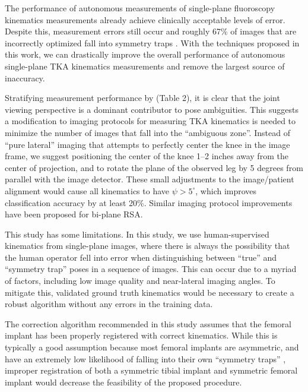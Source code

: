 {The performance of autonomous measurements of single-plane fluoroscopy
kinematics measurements already achieve clinically acceptable levels of error.
Despite this, measurement errors still occur and roughly 67\% of images that are
incorrectly optimized fall into symmetry traps
\cite{jensenJointTrackMachine2023,brobergValidationMachineLearning2023}. With
the techniques proposed in this work, we can drastically improve the overall
performance of autonomous single-plane TKA kinematics measurements and remove
the largest source of inaccuracy.


Stratifying measurement performance by (Table 2), it is clear that the joint
viewing perspective is a dominant contributor to pose ambiguities. This suggests
a modification to imaging protocols for measuring TKA kinematics is needed to
minimize the number of images that fall into the “ambiguous zone”. Instead of
“pure lateral” imaging that attempts to perfectly center the knee in the image
frame, we suggest positioning the center of the knee 1–2 inches away from the
center of projection, and to rotate the plane of the observed leg by 5 degrees
from parallel with the image detector. These small adjustments to the
image/patient alignment would cause all kinematics to have $\psi > 5^{\circ}$,
which improves classification accuracy by at least 20\%. Similar imaging
protocol improvements have been proposed for bi-plane
RSA\cite{niesenReorientingTibialBaseplate2020}.

This study has some limitations. In this study, we use human-supervised
kinematics from single-plane images, where there is always the possibility that
the human operator fell into error when distinguishing between “true” and
“symmetry trap” poses in a sequence of images. This can occur due to a myriad of
factors, including low image quality and near-lateral imaging angles. To
mitigate this, validated ground truth kinematics would be necessary to create a
robust algorithm without any errors in the training data.

The correction algorithm recommended in this study assumes that the femoral
implant has been properly registered with correct kinematics. While this is
typically a good assumption because most femoral implants are asymmetric, and
have an extremely low likelihood of falling into their own “symmetry traps”
\cite{jensenJointTrackMachine2023}, improper registration of both a symmetric
tibial implant and symmetric femoral implant would decrease the feasibility of
the proposed procedure.

}
